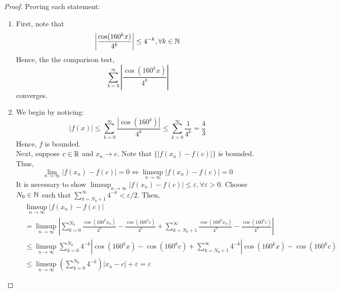 \begin{proof}
    Proving each statement:
    \begin{enumerate}
        \item First, note that
            \begin{equation*}
                \left | \frac{\cos (160^k x)}{4^k}\right | \leq 4^{-k}, \forall k \in \mathbb{N}
            \end{equation*}
            Hence, the the comparison test, 
            \begin{equation*}
                \sum \limits_{k=0}^\infty \left | \frac{\cos (160^k x)}{4^k}\right |
            \end{equation*}
            converges.
        \item We begin by noticing:
        \begin{equation*}
            |f(x)| \leq \sum \limits_{k=0}^\infty \frac{|\cos (160^k)|}{4^k} \leq \sum \limits_{k=0}^\infty \frac{1}{4^k} = \frac{4}{3}
        \end{equation*}
        Hence, $f$ is bounded.\\
        Next, suppose $c \in \mathbb{R}$ and $x_n \to c$. Note that $\{|f(x_n) - f(c)|\}$ is bounded. Thus,
        \begin{equation*}
            \lim \limits_{n \to \infty} |f(x_n) - f(c)| = 0 \Longleftrightarrow \limsup \limits_{n \to \infty} |f(x_n) - f(c)| = 0
        \end{equation*}
        It is necessary to show $\limsup_{n \to \infty} |f(x_n) - f(c)| \leq \varepsilon, \forall \varepsilon > 0$. Choose $N_0 \in \mathbb{N}$ such that $\sum_{k=N_0 + 1}^\infty 4^{-k} < \varepsilon/2$. Then,
        \begin{align*}
            &\limsup \limits_{n \to \infty} |f(x_n) - f(c)| \\
            &= \limsup \limits_{n \to \infty} \left |
                \sum \limits_{k=0}^{N_0} \frac{\cos (160^k x_n)}{4^k} - \frac{\cos (160^k c)}{4^k} + 
                \sum \limits_{k=N_0 + 1}^\infty \frac{\cos (160^k x_n)}{4^k} - \frac{\cos (160^k c)}{4^k}
            \right | \\
            &\leq \limsup \limits_{n \to \infty} \sum \limits_{k = 0}^{N_0} 4^{-k} |\cos (160^k x) - \cos( 160^k c) + \sum \limits_{k = N_0 + 1}^\infty 4^{-k} |\cos (160^k x) - \cos( 160^k c) \\
            &\leq \limsup \limits_{n \to \infty} \left ( \sum \limits_{k=0}^{N_0} 4^{-k}\right) |x_n - c| + \varepsilon = \varepsilon
        \end{align*}
    \end{enumerate}
\end{proof}

